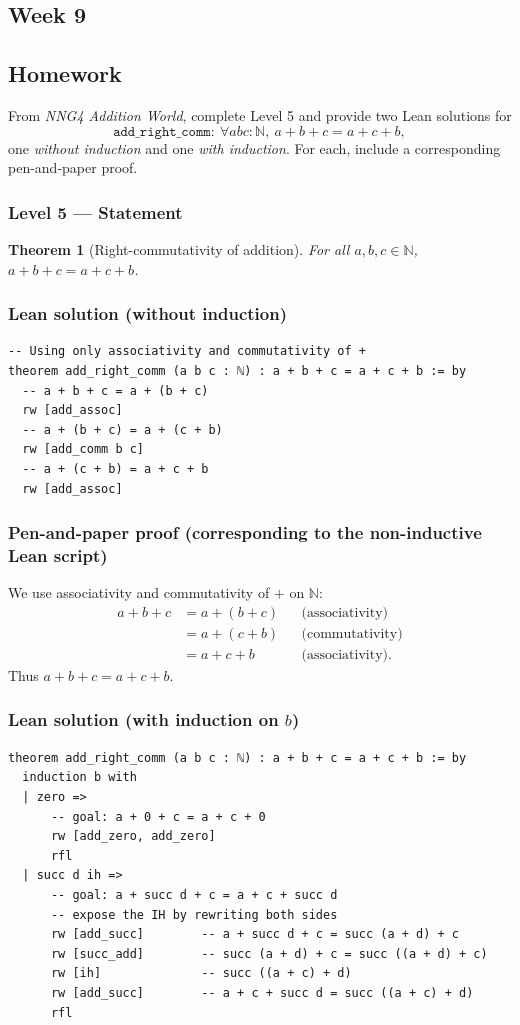 \documentclass{article}
\theoremstyle{theorem}
\newtheorem{theorem}{Theorem}[section]
\theoremstyle{definition}
\theoremstyle{remark}
\begin{document}
\subsection{Week 9}\label{sec:week9}
\smallskip
\subsection*{Homework}
From \emph{NNG4 Addition World}, complete Level 5 and provide two Lean solutions for
\[
\texttt{add\_right\_comm} : \ \forall a b c : \mathbb{N},\ a+b+c = a+c+b,
\]
one \emph{without induction} and one \emph{with induction}. For each, include a corresponding pen-and-paper proof.

\subsubsection*{Level 5 — Statement}
\begin{theorem}[Right-commutativity of addition]
For all $a,b,c\in\mathbb N$, \; $a+b+c = a+c+b$.
\end{theorem}

\subsubsection*{Lean solution (without induction)}
\begin{lstlisting}
-- Using only associativity and commutativity of +
theorem add_right_comm (a b c : ℕ) : a + b + c = a + c + b := by
  -- a + b + c = a + (b + c)
  rw [add_assoc]
  -- a + (b + c) = a + (c + b)
  rw [add_comm b c]
  -- a + (c + b) = a + c + b
  rw [add_assoc]
\end{lstlisting}

\subsubsection*{Pen-and-paper proof (corresponding to the non-inductive Lean script)}
We use associativity and commutativity of $+$ on $\mathbb N$:
\[
\begin{aligned}
a+b+c &= a+(b+c) &&\text{(associativity)}\\
      &= a+(c+b) &&\text{(commutativity)}\\
      &= a+c+b   &&\text{(associativity).}
\end{aligned}
\]
Thus $a+b+c=a+c+b$.

\subsubsection*{Lean solution (with induction on \(b\))}
\begin{lstlisting}
theorem add_right_comm (a b c : ℕ) : a + b + c = a + c + b := by
  induction b with
  | zero =>
      -- goal: a + 0 + c = a + c + 0
      rw [add_zero, add_zero]
      rfl
  | succ d ih =>
      -- goal: a + succ d + c = a + c + succ d
      -- expose the IH by rewriting both sides
      rw [add_succ]        -- a + succ d + c = succ (a + d) + c
      rw [succ_add]        -- succ (a + d) + c = succ ((a + d) + c)
      rw [ih]              -- succ ((a + c) + d)
      rw [add_succ]        -- a + c + succ d = succ ((a + c) + d)
      rfl
\end{lstlisting}
\end{document}
